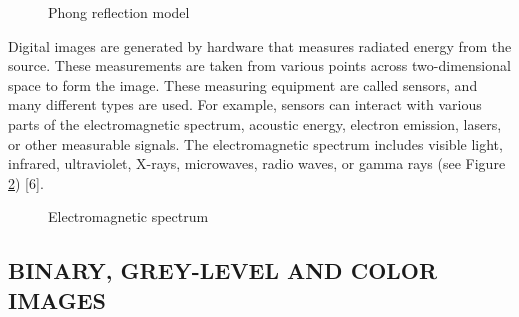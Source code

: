\begin{figure}[htbp]
\centering
{}
\caption{Phong reflection model \cite{kurihara2012shading}}
\label{fig:PhongReflectionModel}
\end{figure}

Digital images are generated by hardware that measures radiated energy from the source. These measurements are taken from various points across two-dimensional space to form the image. These measuring equipment are called sensors, and many different types are used. For example, sensors can interact with various parts of the electromagnetic spectrum, acoustic energy, electron emission, lasers, or other measurable signals. The electromagnetic spectrum includes visible light, infrared, ultraviolet, X-rays, microwaves, radio waves, or gamma rays (see Figure \ref{fig:EMSpectrumcolor}) [6].

\begin{figure}[htbp]
\centering
{}
\caption{Electromagnetic spectrum \cite{ElectromagneticSpectrum}}
\label{fig:EMSpectrumcolor}
\end{figure}

\subsection{BINARY, GREY-LEVEL AND COLOR IMAGES}

